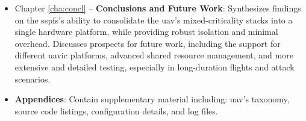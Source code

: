 \begin{itemize}
\item 
Chapter \ref{cha:concl} -- \textbf{Conclusions and Future Work}:
Synthesizes findings on the \gls{sspfs}'s ability to consolidate the \gls{uav}'s
mixed-criticality stacks into a single hardware platform, while providing robust isolation and minimal overhead. Discusses prospects
for future work, including the support for different \gls{uavic} platforms,
advanced shared resource management, and more extensive and detailed testing,
especially in long-duration flights and attack scenarios.

\item
\textbf{Appendices}: Contain supplementary material including: \gls{uav}'s taxonomy, source code
listings, configuration details, and log files.
\end{itemize}


